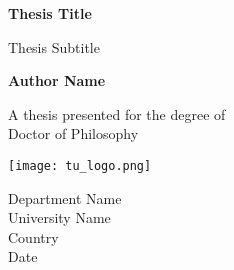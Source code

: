 \begin{titlepage}
    \begin{center}
        \vspace*{1cm}
        
        \Huge
        \textbf{Thesis Title}
        
        \vspace{0.5cm}
        \LARGE
        Thesis Subtitle
        
        \vspace{1.5cm}
        
        \textbf{Author Name}
        
        \vfill
        
        A thesis presented for the degree of\\
        Doctor of Philosophy
        
        \vspace{0.8cm}
        
        \texttt{[image: tu\_logo.png]}

        \vspace*{1cm}
        
        \Large
        Department Name\\
        University Name\\
        Country\\
        Date
        
    \end{center}
\end{titlepage}

